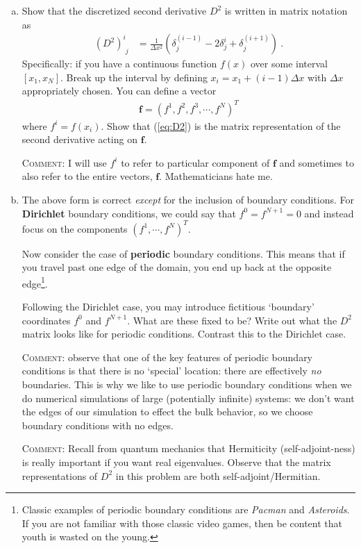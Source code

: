 \documentclass[12pt]{article}
\numberwithin{equation}{subsection}    %
\renewcommand{\vec}[1]{\mathbf{#1}} %
\begin{document}
\begin{enumerate}[(a)]
	\item Show that the discretized second derivative $D^2$ is written in matrix notation as
\begin{align}
	\left(D^2\right)^i_{\phantom{i}j}
	&= 
	\frac{1}{\Delta x^2}
	\left(
	\delta_j^{(i-1)}
	- 2 \delta_j^{i}
	+
	\delta_j^{(i+1)}
	\right) \ .
	\label{eq:D2}
\end{align}
Specifically: if you have a continuous function $f(x)$ over some interval $[x_1, x_N]$. Break up the interval by defining $x_i = x_1 + (i-1)\Delta x$ with $\Delta x$ appropriately chosen. You can define a vector
\begin{align}
	\vec{f} = (f^1, f^2, f^3, \cdots, f^N)^T
\end{align}
where $f^i = f(x_i)$. Show that (\ref{eq:D2}) is the matrix representation of the second derivative acting on $\vec{f}$. 

\textsc{Comment}: I will use $f^i$ to refer to particular component of $\vec{f}$ and  sometimes to also refer to the entire vectors, $\vec{f}$. Mathematicians hate me.

\item The above form is correct \emph{except} for the inclusion of boundary conditions. For \textbf{Dirichlet} boundary conditions, we could say that $f^0 = f^{N+1} = 0$ and instead focus on the components $\left(f^1, \cdots, f^N\right)^T$. 

Now consider the case of \textbf{periodic} boundary conditions. This means that if you travel past one edge of the domain, you end up back at the opposite edge\footnote{Classic examples of periodic boundary conditions are \emph{Pacman} and \emph{Asteroids}. If you are not familiar with those classic video games, then be content that youth is wasted on the young.}.

Following the Dirichlet case, you may introduce fictitious `boundary' coordinates $f^0$ and $f^{N+1}$. What are these fixed to be? Write out what the $D^2$ matrix looks like for periodic conditions. Contrast this to the Dirichlet case.

\textsc{Comment}: observe that one of the key features of periodic boundary conditions is that there is no `special' location: there are effectively \emph{no} boundaries. This is why we like to use periodic boundary conditions when we do numerical simulations of large (potentially infinite) systems: we don't want the edges of our simulation to effect the bulk behavior, so we choose boundary conditions with no edges.

\textsc{Comment}: Recall from quantum mechanics that Hermiticity (self-adjoint-ness) is really important if you want real eigenvalues. Observe that the matrix representations of $D^2$ in this problem are both self-adjoint/Hermitian. 



\end{enumerate}
\end{document}
